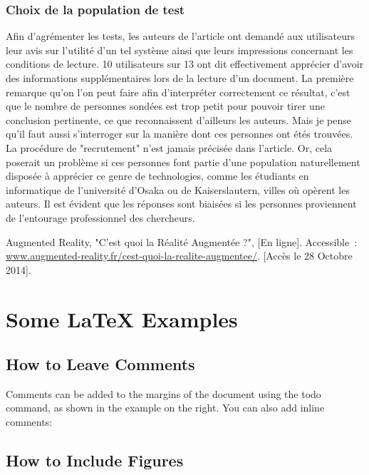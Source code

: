 \documentclass[a4paper]{article}
\begin{document}
\subsubsection{Choix de la population de test}
Afin d'agrémenter les tests, les auteurs de l'article ont demandé aux utilisateurs leur avis sur l'utilité d'un tel système ainsi que leurs impressions concernant les conditions de lecture. 10 utilisateurs sur 13 ont dit effectivement apprécier d'avoir des informations supplémentaires lors de la lecture d'un document. La première remarque qu'on l'on peut faire afin d'interpréter correctement ce résultat, c'est que le nombre de personnes sondées est trop petit pour pouvoir tirer une conclusion pertinente, ce que reconnaissent d'ailleurs les auteurs. Mais je pense qu'il faut aussi s'interroger sur la manière dont ces personnes ont étés trouvées. La procédure de "recrutement" n'est jamais précisée dans l'article. Or, cela poserait un problème si ces personnes font partie d'une population naturellement disposée à apprécier ce genre de technologies, comme les étudiants en informatique de l'université d'Osaka ou de Kaiserslautern, villes où opèrent les auteurs. Il est évident que les réponses sont biaisées si les personnes proviennent de l'entourage professionnel des chercheurs.

\begin{thebibliography}{1}
	 Augmented Reality, "C'est quoi la Réalité Augmentée ?", [En ligne]. Accessible~: \url{www.augmented-reality.fr/cest-quoi-la-realite-augmentee/}. [Accès le 28 Octobre 2014].
\end{thebibliography}

\newpage

\section{Some \LaTeX{} Examples}
\label{sec:examples}

\subsection{How to Leave Comments}

Comments can be added to the margins of the document using the  todo command, as shown in the example on the right. You can also add inline comments:


\subsection{How to Include Figures}
\end{document}
